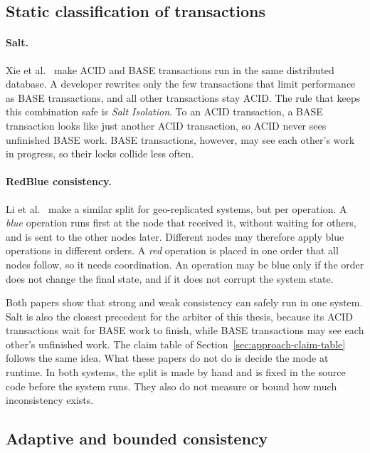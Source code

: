 \subsection{Static classification of transactions}\label{sec:rw-static}

\paragraph{Salt.} Xie et al.~\cite{xie2014salt} make ACID and BASE transactions
run in the same distributed database. A developer rewrites only the few
transactions that limit performance as BASE transactions, and all other
transactions stay ACID. The rule that keeps this combination safe is \emph{Salt
  Isolation}. To an ACID transaction, a BASE transaction looks like just another
ACID transaction, so ACID never sees unfinished BASE work. BASE transactions,
however, may see each other's work in progress, so their locks collide less
often.

\paragraph{RedBlue consistency.} Li et al.~\cite{li2012redblue} make a similar
split for geo-replicated systems, but per operation. A \emph{blue} operation
runs first at the node that received it, without waiting for others, and is
sent to the other nodes later. Different nodes may therefore apply blue
operations in different orders. A \emph{red} operation is placed in one order
that all nodes follow, so it needs coordination. An operation may be blue only
if the order does not change the final state, and if it does not corrupt the
system state.

\vspace{1.8ex plus .4ex minus .2ex}
\noindent Both papers show that strong and weak consistency can safely run in one system.
Salt is also the closest precedent for the arbiter of this thesis, because its
ACID transactions wait for BASE work to finish, while BASE transactions may see
each other's unfinished work. The claim table of Section~\ref{sec:approach-claim-table}
follows the same idea. What these papers do not do is decide the mode at
runtime. In both systems, the split is made by hand and is fixed in the source
code before the system runs. They also do not measure or bound how much
inconsistency exists.

\subsection{Adaptive and bounded
  consistency}\label{sec:rw-adaptive}\label{sec:rw-bounded}

